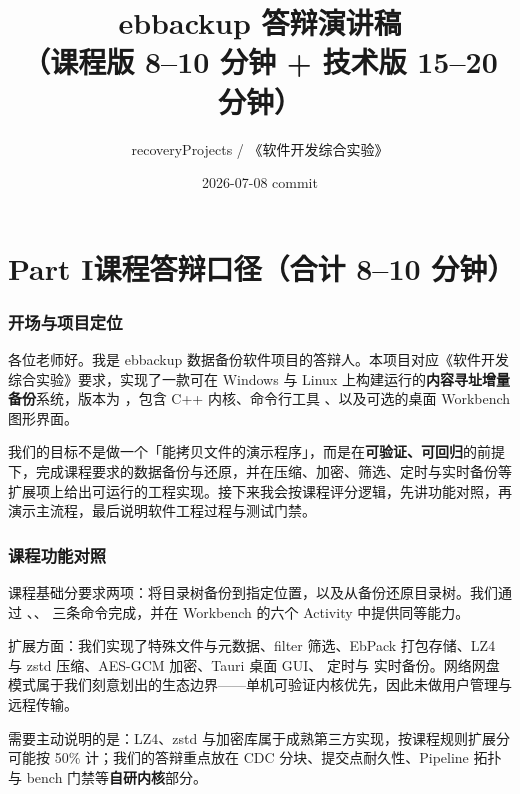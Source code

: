 \documentclass[11pt,a4paper,fontset=none]{ctexart}
\title{ebbackup 答辩演讲稿\\（课程版 8--10 分钟 + 技术版 15--20 分钟）}
\author{recoveryProjects / 《软件开发综合实验》}
\date{2026-07-08 \quad commit \gitdesc{965431b}}
\begin{document}
\maketitle
\tableofcontents
\newpage

\part{Part I\quad 课程答辩口径（合计 8--10 分钟）}

\section{开场与项目定位}
\begin{say}
各位老师好。我是 ebbackup 数据备份软件项目的答辩人。本项目对应《软件开发综合实验》要求，实现了一款可在 Windows 与 Linux 上构建运行的\textbf{内容寻址增量备份}系统，版本为 ，包含 C++ 内核、命令行工具 、以及可选的桌面 Workbench 图形界面。

我们的目标不是做一个「能拷贝文件的演示程序」，而是在\textbf{可验证、可回归}的前提下，完成课程要求的数据备份与还原，并在压缩、加密、筛选、定时与实时备份等扩展项上给出可运行的工程实现。接下来我会按课程评分逻辑，先讲功能对照，再演示主流程，最后说明软件工程过程与测试门禁。
\end{say}

\section{课程功能对照}

\begin{say}
课程基础分要求两项：将目录树备份到指定位置，以及从备份还原目录树。我们通过 、、 三条命令完成，并在 Workbench 的六个 Activity 中提供同等能力。

扩展方面：我们实现了特殊文件与元数据、filter 筛选、EbPack 打包存储、LZ4 与 zstd 压缩、AES-GCM 加密、Tauri 桌面 GUI、 定时与  实时备份。网络网盘模式属于我们刻意划出的生态边界——单机可验证内核优先，因此未做用户管理与远程传输。

需要主动说明的是：LZ4、zstd 与加密库属于成熟第三方实现，按课程规则扩展分可能按 50\% 计；我们的答辩重点放在 CDC 分块、提交点耐久性、Pipeline 拓扑与 bench 门禁等\textbf{自研内核}部分。
\end{say}
\end{document}

